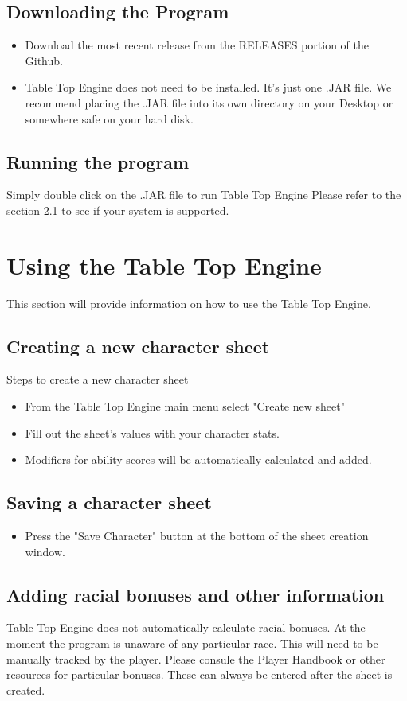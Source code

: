 \documentclass{article}
\begin{document}
\subsection{Downloading the Program}
\begin{itemize}
    \item Download the most recent release from the RELEASES portion of the Github.
    \item Table Top Engine does not need to be installed. It's just one .JAR file. We recommend placing the .JAR file into its own directory on your Desktop or somewhere safe on your hard disk. 
\end{itemize}
\subsection{Running the program}
Simply double click on the .JAR file to run Table Top Engine \break
Please refer to the section 2.1 to see if your system is supported. 
\newpage
\section{Using the Table Top Engine}
This section will provide information on how to use the Table Top Engine.
\subsection{Creating a new character sheet}
Steps to create a new character sheet
\begin{itemize}
    \item From the Table Top Engine main menu select "Create new sheet" 
    \item Fill out the sheet's values with your character stats. 
    \item Modifiers for ability scores will be automatically calculated and added. 
\end{itemize}
\subsection{Saving a character sheet}
\begin{itemize}
    \item Press the "Save Character" button at the bottom of the sheet creation window. 
\end{itemize}
\subsection{Adding racial bonuses and other information}
Table Top Engine does not automatically calculate racial bonuses. At the moment the program is unaware of any particular race. This will need to be manually tracked by the player. Please consule the Player Handbook or other resources for particular bonuses. These can always be entered after the sheet is created. 
\end{document}
